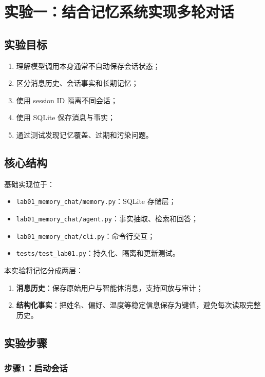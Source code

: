 \documentclass[UTF8,zihao=-4]{ctexart}
\begin{document}
\section{实验一：结合记忆系统实现多轮对话}

\subsection{实验目标}

\begin{enumerate}
  \item 理解模型调用本身通常不自动保存会话状态；
  \item 区分消息历史、会话事实和长期记忆；
  \item 使用 session ID 隔离不同会话；
  \item 使用 SQLite 保存消息与事实；
  \item 通过测试发现记忆覆盖、过期和污染问题。
\end{enumerate}

\subsection{核心结构}

基础实现位于：

\begin{itemize}
  \item \texttt{lab01\_memory\_chat/memory.py}：SQLite 存储层；
  \item \texttt{lab01\_memory\_chat/agent.py}：事实抽取、检索和回答；
  \item \texttt{lab01\_memory\_chat/cli.py}：命令行交互；
  \item \texttt{tests/test\_lab01.py}：持久化、隔离和更新测试。
\end{itemize}

本实验将记忆分成两层：

\begin{enumerate}
  \item \textbf{消息历史}：保存原始用户与智能体消息，支持回放与审计；
  \item \textbf{结构化事实}：把姓名、偏好、温度等稳定信息保存为键值，避免每次读取完整历史。
\end{enumerate}

\subsection{实验步骤}

\subsubsection{步骤1：启动会话}
\end{document}
